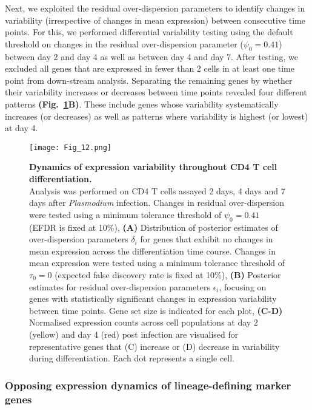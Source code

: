 Next, we exploited the residual over-dispersion parameters to identify changes in variability (irrespective of changes in mean expression) between consecutive time points. 
For this, we performed differential variability testing using the default threshold on changes in the residual over-dispersion parameter ($\psi_0 = 0.41$) between day 2 and day 4 as well as between day 4 and day 7. 
After testing, we excluded all genes that are expressed in fewer than 2 cells in at least one time point from down-stream analysis. 
Separating the remaining genes by whether their variability increases or decreases between time points revealed four different patterns \textbf{(Fig.~\ref{fig2:immune_differentiation}B)}. 
These include genes whose variability systematically increases (or decreases) as well as patterns where variability is highest (or lowest) at day 4. 

\begin{figure}[!h]
\centering
\texttt{[image: Fig\_12.png]}
\caption[Dynamics of expression variability throughout CD4\plus{} T cell differentiation]{\textbf{Dynamics of expression variability throughout CD4\plus{} T cell differentiation.}\\
Analysis was performed on CD4\plus{} T cells assayed 2 days, 4 days and 7 days after \textit{Plasmodium} infection. 
Changes in residual over-dispersion were tested using a minimum tolerance threshold of $\psi_0=0.41$ (EFDR is fixed at 10\%), 
\textbf{(A)} Distribution of posterior estimates of over-dispersion parameters $\delta_i$ for genes that exhibit no changes in mean expression across the differentiation time course. 
Changes in mean expression were tested using a minimum tolerance threshold of $\tau_0=0$ (expected false discovery rate is fixed at 10\%), 
\textbf{(B)} Posterior estimates for residual over-dispersion parameters  $\epsilon_i$, focusing on genes with statistically significant changes in expression variability between time points. 
Gene set size is indicated for each plot, 
\textbf{(C-D)} Normalised expression counts across cell populations at day 2 (yellow) and day 4 (red) post infection are visualised for representative genes that (C) increase or (D) decrease in variability during differentiation. 
Each dot represents a single cell.\\}
\label{fig2:immune_differentiation}
\end{figure}

\subsubsection{Opposing expression dynamics of lineage-defining marker genes}

